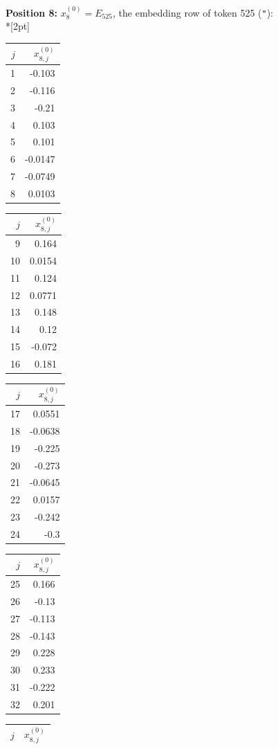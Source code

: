 \noindent \textbf{Position 8:} $x^{(0)}_{8} = E_{525}$, the embedding row of token 525 (\texttt{"}):\\*[2pt]
{\tablefont \begin{tabular}[t]{r|r}
$j$ & $x^{(0)}_{8,j}$ \\\hline
1 & -0.103 \\
2 & -0.116 \\
3 & -0.21 \\
4 & 0.103 \\
5 & 0.101 \\
6 & -0.0147 \\
7 & -0.0749 \\
8 & 0.0103
\end{tabular}\kern4pt
\begin{tabular}[t]{r|r}
$j$ & $x^{(0)}_{8,j}$ \\\hline
9 & 0.164 \\
10 & 0.0154 \\
11 & 0.124 \\
12 & 0.0771 \\
13 & 0.148 \\
14 & 0.12 \\
15 & -0.072 \\
16 & 0.181
\end{tabular}\kern4pt
\begin{tabular}[t]{r|r}
$j$ & $x^{(0)}_{8,j}$ \\\hline
17 & 0.0551 \\
18 & -0.0638 \\
19 & -0.225 \\
20 & -0.273 \\
21 & -0.0645 \\
22 & 0.0157 \\
23 & -0.242 \\
24 & -0.3
\end{tabular}\kern4pt
\begin{tabular}[t]{r|r}
$j$ & $x^{(0)}_{8,j}$ \\\hline
25 & 0.166 \\
26 & -0.13 \\
27 & -0.113 \\
28 & -0.143 \\
29 & 0.228 \\
30 & 0.233 \\
31 & -0.222 \\
32 & 0.201
\end{tabular}\kern4pt
\begin{tabular}[t]{r|r}
$j$ & $x^{(0)}_{8,j}$ \\\hline

\end{tabular}}
